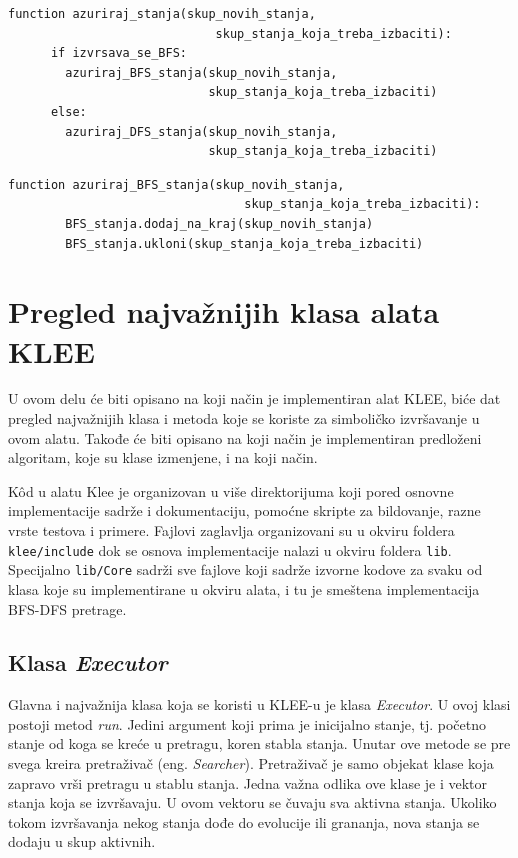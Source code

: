 \documentclass[12pt,oneside]{memoir}
\begin{document}
    \begin{lstlisting}[caption={Pseudo k\^od funkcije za ažuriranje stanja},captionpos=b,label={lst:azuriraj_stanja}]
    function azuriraj_stanja(skup_novih_stanja, 
                             skup_stanja_koja_treba_izbaciti):
      if izvrsava_se_BFS:
        azuriraj_BFS_stanja(skup_novih_stanja, 
                            skup_stanja_koja_treba_izbaciti)
      else:
        azuriraj_DFS_stanja(skup_novih_stanja, 
                            skup_stanja_koja_treba_izbaciti)
    \end{lstlisting}
    
    \begin{lstlisting}[caption={Pseudo k\^od funkcije za ažuriranje BFS stanja},captionpos=b,label={lst:azuriraj_BFS}]
    function azuriraj_BFS_stanja(skup_novih_stanja, 
                                 skup_stanja_koja_treba_izbaciti):
        BFS_stanja.dodaj_na_kraj(skup_novih_stanja)
        BFS_stanja.ukloni(skup_stanja_koja_treba_izbaciti)
    \end{lstlisting}
    
\section{Pregled najvažnijih klasa alata KLEE}
U ovom delu će biti opisano na koji način je implementiran alat KLEE, biće dat pregled najvažnijih klasa i metoda koje se koriste za simboličko izvršavanje u ovom alatu. Takođe će biti opisano na koji način je implementiran predloženi algoritam, koje su klase izmenjene, i na koji način.

K\^od u alatu Klee je organizovan u više direktorijuma koji pored osnovne implementacije sadrže i dokumentaciju, pomoćne skripte za bildovanje, razne vrste testova i primere. Fajlovi zaglavlja organizovani su u okviru foldera \texttt{klee/include} dok se osnova implementacije nalazi u okviru foldera \texttt{lib}. Specijalno \texttt{lib/Core} sadrži sve fajlove koji sadrže izvorne kodove za svaku od klasa koje su implementirane u okviru alata, i tu je smeštena implementacija BFS-DFS pretrage.

\subsection{Klasa \textit{Executor}}
Glavna i najvažnija klasa koja se koristi u KLEE-u je klasa \textit{Executor}. U ovoj klasi postoji metod \textit{run}. Jedini argument koji prima je inicijalno stanje, tj. početno stanje od koga se kreće u pretragu, koren stabla stanja. Unutar ove metode se pre svega kreira pretraživač (eng. \textit{Searcher}). 
Pretraživač je samo objekat klase koja zapravo vrši pretragu u stablu stanja. Jedna važna odlika ove klase je i vektor stanja koja se izvršavaju. U ovom vektoru se čuvaju sva aktivna stanja. Ukoliko tokom izvršavanja nekog stanja dođe do evolucije ili grananja, nova stanja se dodaju u skup aktivnih.
\end{document}
